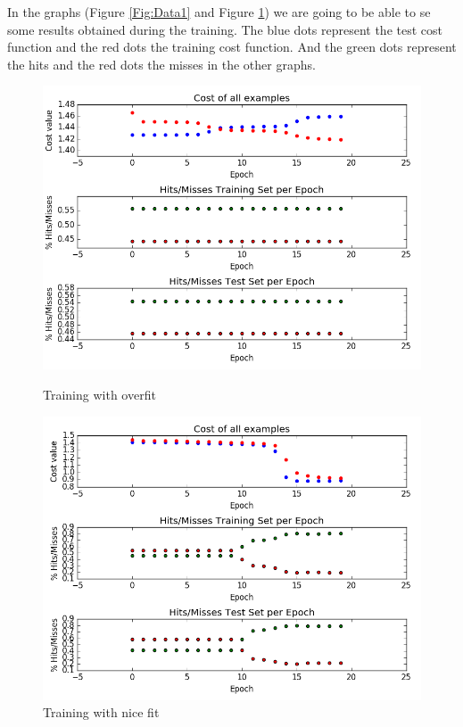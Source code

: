 \documentclass[12pt]{article}
\begin{document}
In the graphs (Figure \ref{Fig:Data1} and Figure \ref{Fig:Data2}) we are going to be able to se some results obtained during the training. The blue dots represent the test cost function and the red dots the training cost function. And the green dots represent the hits and the red dots the misses in the other graphs.
\begin{figure}[!htb]
   \begin{minipage}{0.48\textwidth}
     \centering
     \includegraphics[width=.9\linewidth]{Plot_29_01_2017_22_26.png}
     \caption{Training with overfit}\label{Fig:Data1}
   \end{minipage}\hfill
   \begin {minipage}{0.48\textwidth}
     \centering
     \includegraphics[width=.9\linewidth]{Plot_30_01_2017_03_42.png}
     \caption{Training with nice fit}\label{Fig:Data2}
   \end{minipage}
\end{figure}
\end{document}
